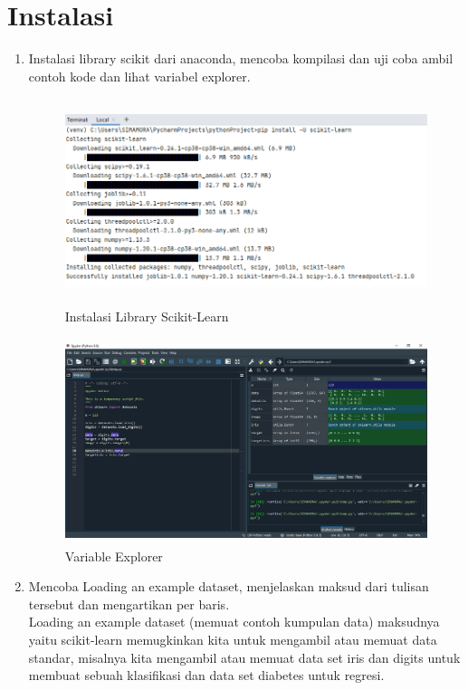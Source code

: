 \section{Instalasi}
\begin{enumerate}
\item
Instalasi library scikit dari anaconda, mencoba kompilasi dan uji coba ambil contoh kode dan lihat variabel explorer.\\

\begin{figure}
    \centering
    \includegraphics[width=12cm,height=6cm]{figures/1.PNG}
    \caption{Instalasi Library Scikit-Learn}
    \label{fig:my_label}
\end{figure}

\begin{figure}
    \centering
    \includegraphics[width=12cm,height=6cm]{figures/ve.PNG}
    \caption{Variable Explorer}
    \label{fig:my_label}
\end{figure}

\item
Mencoba Loading an example dataset, menjelaskan maksud dari tulisan tersebut dan mengartikan per baris.\\

Loading an example dataset (memuat contoh kumpulan data) maksudnya yaitu scikit-learn memugkinkan kita untuk mengambil atau memuat data standar, misalnya kita mengambil atau memuat data set iris dan digits untuk membuat sebuah klasifikasi dan data set diabetes untuk regresi.\\


\end{enumerate}
